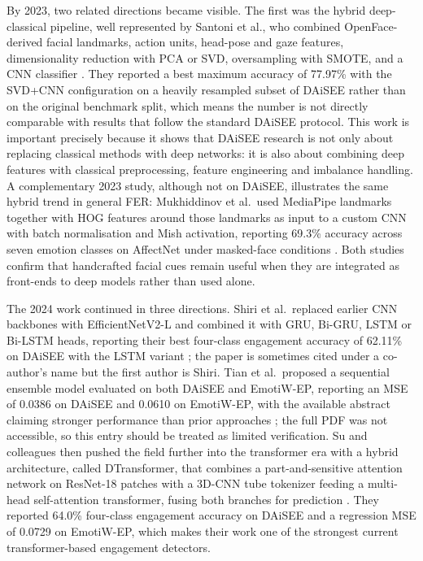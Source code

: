 By 2023, two related directions became visible. The first was the hybrid deep-classical pipeline, well represented by Santoni et al., who combined OpenFace-derived facial landmarks, action units, head-pose and gaze features, dimensionality reduction with PCA or SVD, oversampling with SMOTE, and a CNN classifier \cite{santoni_convolutional_2023}. They reported a best maximum accuracy of 77.97\% with the SVD+CNN configuration on a heavily resampled subset of DAiSEE rather than on the original benchmark split, which means the number is not directly comparable with results that follow the standard DAiSEE protocol. This work is important precisely because it shows that DAiSEE research is not only about replacing classical methods with deep networks: it is also about combining deep features with classical preprocessing, feature engineering and imbalance handling. A complementary 2023 study, although not on DAiSEE, illustrates the same hybrid trend in general FER: Mukhiddinov et al.\ used MediaPipe landmarks together with HOG features around those landmarks as input to a custom CNN with batch normalisation and Mish activation, reporting 69.3\% accuracy across seven emotion classes on AffectNet under masked-face conditions \cite{mukhiddinov_masked_2023}. Both studies confirm that handcrafted facial cues remain useful when they are integrated as front-ends to deep models rather than used alone.

The 2024 work continued in three directions. Shiri et al.\ replaced earlier CNN backbones with EfficientNetV2-L and combined it with GRU, Bi-GRU, LSTM or Bi-LSTM heads, reporting their best four-class engagement accuracy of 62.11\% on DAiSEE with the LSTM variant \cite{shiri_detection_2024}; the paper is sometimes cited under a co-author's name but the first author is Shiri. Tian et al.\ proposed a sequential ensemble model evaluated on both DAiSEE and EmotiW-EP, reporting an MSE of 0.0386 on DAiSEE and 0.0610 on EmotiW-EP, with the available abstract claiming stronger performance than prior approaches \cite{tian_predicting_2024}; the full PDF was not accessible, so this entry should be treated as limited verification. Su and colleagues then pushed the field further into the transformer era with a hybrid architecture, called DTransformer, that combines a part-and-sensitive attention network on ResNet-18 patches with a 3D-CNN tube tokenizer feeding a multi-head self-attention transformer, fusing both branches for prediction \cite{su_leveraging_2024}. They reported 64.0\% four-class engagement accuracy on DAiSEE and a regression MSE of 0.0729 on EmotiW-EP, which makes their work one of the strongest current transformer-based engagement detectors.

